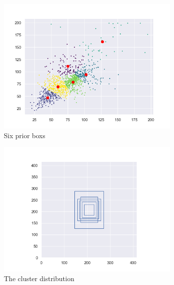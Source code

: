 \begin{figure}[h]
	\begin{center}
		\begin{subfigure}[b]{0.49\textwidth}
			\includegraphics[width=\textwidth]{thesis-template-master/images/Figurefor 1480_1.png}
			\caption{ Six prior boxs}
			\label{fig:res18}
		\end{subfigure}
		\begin{subfigure}[b]{0.49\textwidth}
		    \centering
			\includegraphics[width=\textwidth]{thesis-template-master/images/Figure_for1480.png}
			\caption{The cluster distribution}
			\label{fig:cellnet}
		\end{subfigure}
		\begin{subfigure}[b]{0.49\textwidth}

\end{subfigure}
\end{center}
\end{figure}
